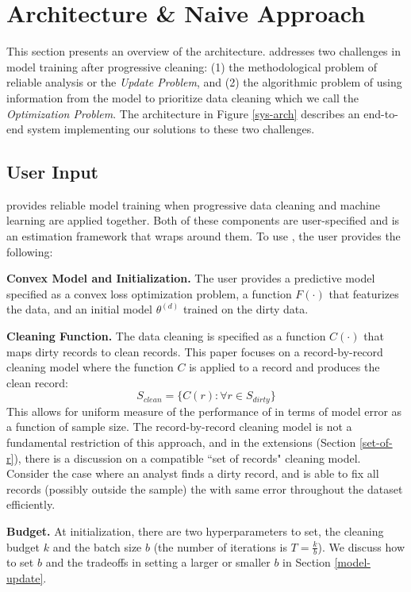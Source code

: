 \section{Architecture \& Naive Approach}\label{arch}
This section presents an overview of the \sys architecture.
\sys addresses two challenges in model training after progressive cleaning: (1) the methodological problem of reliable analysis or the \emph{Update Problem}, and (2) the algorithmic problem of using information from the model to prioritize data cleaning which we call the \emph{Optimization Problem}.
The \sys architecture in Figure \ref{sys-arch} describes an end-to-end system implementing our solutions to these two challenges.

\subsection{User Input}\label{uinp}
\sys provides reliable model training when progressive data cleaning and machine learning are applied together.
Both of these components are user-specified and \sys is an estimation framework that wraps around them.
To use \sys, the user provides the following:

\noindent\textbf{Convex Model and Initialization. } The user provides a predictive model specified as a convex loss optimization problem, a function $F(\cdot)$ that featurizes the data, and an initial model $\theta^{(d)}$ trained on the dirty data. 

\vspace{0.25em}

\noindent\textbf{Cleaning Function. } The data cleaning is specified as a function $C(\cdot)$ that maps dirty records to clean records. This paper focuses on a record-by-record cleaning model where the function $C$ is applied to a record and produces the clean record:
\[
S_{clean} = \{C(r) : \forall r \in S_{dirty}\}
\]
This allows for uniform measure of the performance of \sys in terms of model error as a function of sample size. The record-by-record cleaning model is not a fundamental restriction of this approach, and in the extensions (Section \ref{set-of-r}), there is a discussion on a compatible ``set of records" cleaning model. Consider the case where an analyst finds a dirty record, and is able to fix all records (possibly outside the sample) the with same error throughout the dataset efficiently.

\vspace{0.25em}

\noindent\textbf{Budget. } At initialization, there are two hyperparameters to set, the cleaning budget $k$ and the batch size $b$ (the number of iterations is $T = \frac{k}{b}$).
We discuss how to set $b$ and the tradeoffs in setting a larger or smaller $b$ in Section \ref{model-update}.

